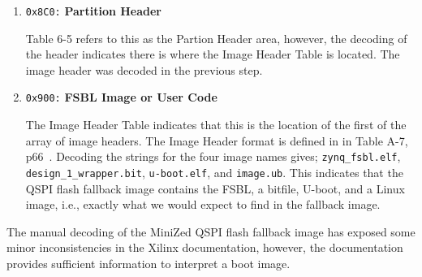 \begin{enumerate}
\item \texttt{0x8C0:} \textbf{Partition Header}

Table 6-5 refers to this as the Partion Header area, however, the
decoding of the header indicates there is where the Image Header Table
is located. The image header was decoded in the previous step.

\item \texttt{0x900:} \textbf{FSBL Image or User Code}

The Image Header Table indicates that this is the location of the
first of the array of image headers. The Image Header format is
defined in in Table A-7, p66~\cite{Xilinx_UG821_2015}.
%
Decoding the strings for the four image names gives;
\verb+zynq_fsbl.elf+, \verb+design_1_wrapper.bit+, \verb+u-boot.elf+,
and \verb+image.ub+. This indicates that the QSPI flash fallback
image contains the FSBL, a bitfile, U-boot, and a Linux image,
i.e., exactly what we would expect to find in the fallback image.

\end{enumerate}
%
The manual decoding of the MiniZed QSPI flash fallback image has exposed
some minor inconsistencies in the Xilinx documentation, however, the
documentation provides sufficient information to interpret a boot image.

